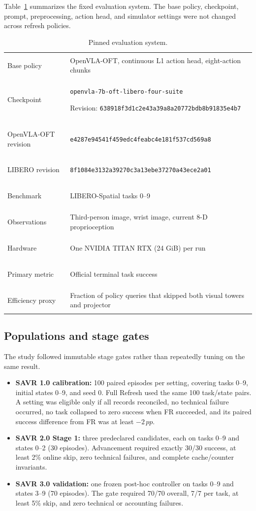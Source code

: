 \documentclass[11pt]{article}
\newcommand{\pp}{\,pp}
\begin{document}
Table~\ref{tab:system} summarizes the fixed evaluation system. The base policy, checkpoint, prompt, preprocessing, action head, and simulator settings were not changed across refresh policies.

\begin{table}[H]
\centering
\scriptsize
\caption{Pinned evaluation system.}
\label{tab:system}
\begin{tabularx}{0.94\linewidth}{>{\bfseries\raggedright\arraybackslash}p{3.2cm}>{\raggedright\arraybackslash}X}
\toprule
Base policy & OpenVLA-OFT, continuous L1 action head, eight-action chunks \\
Checkpoint & \nolinkurl{openvla-7b-oft-libero-four-suite}\par Revision: \nolinkurl{638918f3d1c2e43a39a8a20772bdb8b91835e4b7} \\
OpenVLA-OFT revision & \nolinkurl{e4287e94541f459edc4feabc4e181f537cd569a8} \\
LIBERO revision & \nolinkurl{8f1084e3132a39270c3a13ebe37270a43ece2a01} \\
Benchmark & LIBERO-Spatial tasks 0--9~\cite{libero} \\
Observations & Third-person image, wrist image, current 8-D proprioception \\
Hardware & One NVIDIA TITAN RTX (24 GiB) per run \\
Primary metric & Official terminal task success \\
Efficiency proxy & Fraction of policy queries that skipped both visual towers and projector \\
\bottomrule
\end{tabularx}
\end{table}

\subsection{Populations and stage gates}

The study followed immutable stage gates rather than repeatedly tuning on the same result.

\begin{itemize}
    \item \textbf{SAVR 1.0 calibration:} 100 paired episodes per setting, covering tasks 0--9, initial states 0--9, and seed 0. Full Refresh used the same 100 task/state pairs. A setting was eligible only if all records reconciled, no technical failure occurred, no task collapsed to zero success when FR succeeded, and its paired success difference from FR was at least $-2\pp$.
    \item \textbf{SAVR 2.0 Stage 1:} three predeclared candidates, each on tasks 0--9 and states 0--2 (30 episodes). Advancement required exactly 30/30 success, at least 2\% online skip, zero technical failures, and complete cache/counter invariants.
    \item \textbf{SAVR 3.0 validation:} one frozen post-hoc controller on tasks 0--9 and states 3--9 (70 episodes). The gate required 70/70 overall, 7/7 per task, at least 5\% skip, and zero technical or accounting failures.
\end{itemize}
\end{document}
